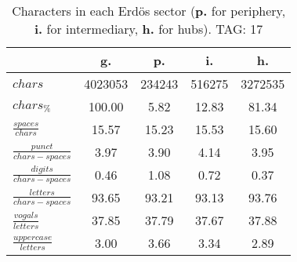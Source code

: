 \begin{table}[h!]
\begin{center}
\begin{tabular}{| l || c | c | c | c |}\hline
 & {\bf g.} & {\bf p.} & {\bf i.} & {\bf h.} \\\hline\hline
$chars$ & 4023053  & 234243  & 516275  & 3272535 \\
$chars_{\%}$ & 100.00  & 5.82  & 12.83  & 81.34 \\\hline
$\frac{spaces}{chars}$ & 15.57  & 15.23  & 15.53  & 15.60 \\
$\frac{punct}{chars-spaces}$ & 3.97  & 3.90  & 4.14  & 3.95 \\
$\frac{digits}{chars-spaces}$ & 0.46  & 1.08  & 0.72  & 0.37 \\\hline
$\frac{letters}{chars-spaces}$ & 93.65  & 93.21  & 93.13  & 93.76 \\
$\frac{vogals}{letters}$ & 37.85  & 37.79  & 37.67  & 37.88 \\
$\frac{uppercase}{letters}$ & 3.00  & 3.66  & 3.34  & 2.89 \\\hline
\end{tabular}
\caption{Characters in each Erd\"os sector ({{\bf p.}} for periphery, {{\bf i.}} for intermediary, 
    {{\bf h.}} for hubs). TAG: 17}
\end{center}
\end{table}